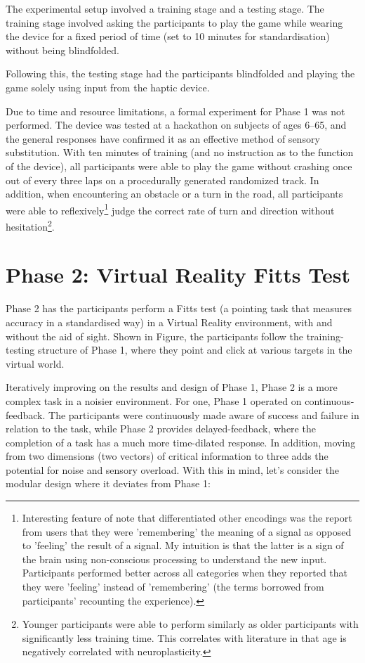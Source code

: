 \documentclass[
12pt, %
oneside, %
english, %
doublespacing, %
headsepline, %
]{MastersDoctoralThesis} %
\begin{document}
The experimental setup involved a training stage and a testing stage. The training stage involved asking the participants to play the game while wearing the device for a fixed period of time (set to 10 minutes for standardisation) without being blindfolded.

Following this, the testing stage had the participants blindfolded and playing the game solely using input from the haptic device.

Due to time and resource limitations, a formal experiment for Phase 1 was not performed. The device was tested at a hackathon on subjects of ages 6--65, and the general responses have confirmed it as an effective method of sensory substitution. With ten minutes of training (and no instruction as to the function of the device), all participants were able to play the game without crashing once out of every three laps on a procedurally generated randomized track. In addition, when encountering an obstacle or a turn in the road, all participants were able to reflexively\footnote{Interesting feature of note that differentiated other encodings was the report from users that they were 'remembering' the meaning of a signal as opposed to 'feeling' the result of a signal. My intuition is that the latter is a sign of the brain using non-conscious processing to understand the new input. Participants performed better across all categories when they reported that they were 'feeling' instead of 'remembering' (the terms borrowed from participants' recounting the experience).} judge the correct rate of turn and direction without hesitation\footnote{Younger participants were able to perform similarly as older participants with significantly less training time. This correlates with literature \parencite{kolb_brain_2011} in that age is negatively correlated with neuroplasticity.}.

\section{Phase 2: Virtual Reality Fitts Test}

Phase 2 has the participants perform a Fitts test (a pointing task that measures accuracy in a standardised way) in a Virtual Reality environment, with and without the aid of sight.
Shown in Figure, the participants follow the training-testing structure of Phase 1, where they point and click at various targets in the virtual world.

Iteratively improving on the results and design of Phase 1, Phase 2 is a more complex task in a noisier environment. For one, Phase 1 operated on continuous-feedback. The participants were continuously made aware of success and failure in relation to the task, while Phase 2 provides delayed-feedback, where the completion of a task has a much more time-dilated response. In addition, moving from two dimensions (two vectors) of critical information to three adds the potential for noise and sensory overload. With this in mind, let's consider the modular design where it deviates from Phase 1:
\end{document}

